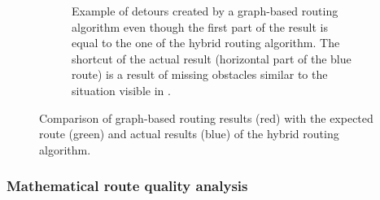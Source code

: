 \begin{figure}[h!]
\begin{minipage}[t]{.48\textwidth}
\begin{subfigure}[t]{\linewidth}
						\caption{Example of detours created by a graph-based routing algorithm even though the first part of the result is equal to the one of the hybrid routing algorithm. The shortcut of the actual result (horizontal part of the blue route) is a result of missing obstacles similar to the situation visible in .}
						\label{fig:eval-rural-graph-based-comparison-17}
					\end{subfigure}
				\end{minipage}
				\caption{Comparison of graph-based routing results (red) with the expected route (green) and actual results (blue) of the hybrid routing algorithm.}
				\label{fig:eval-rural-graph-based-comparison}
			\end{figure}
		
		\subsubsection{Mathematical route quality analysis}
